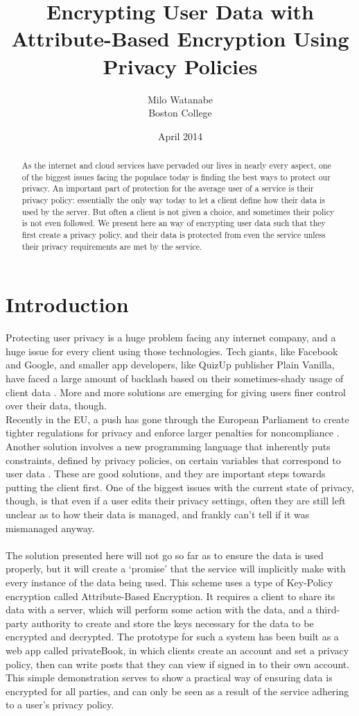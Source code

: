 \documentclass[12pt]{article}
\title {Encrypting User Data with Attribute-Based Encryption Using Privacy Policies}
\author {Milo Watanabe \\ Boston College}
\date{April 2014}
\begin{document}
\maketitle

\begin{abstract}
As the internet and cloud services have pervaded our lives in nearly every aspect, one of the biggest issues facing the populace today is finding the best ways to protect our privacy. An important part of protection for the average user of a service is their privacy policy: essentially the only way today to let a client define how their data is used by the server. But often a client is not given a choice, and sometimes their policy is not even followed.
We present here an way of encrypting user data such that they first create a privacy policy, and their data is protected from even the service unless their privacy requirements are met by the service.
\end{abstract}

\section{Introduction}
Protecting user privacy is a huge problem facing any internet company, and a huge issue for every client using those technologies. Tech giants, like Facebook and Google, and smaller app developers, like QuizUp publisher Plain Vanilla, have faced a large amount of backlash based on their sometimes-shady usage of client data \cite{lawler}. More and more solutions are emerging for giving users finer control over their data, though. \\
Recently in the EU, a push has gone through the European Parliament to create tighter regulations for privacy and enforce larger penalties for noncompliance \cite{bajaj}. Another solution involves a new programming language that inherently puts constraints, defined by privacy policies, on certain variables that correspond to user data \cite{yang}. These are good solutions, and they are important steps towards putting the client first. One of the biggest issues with the current state of privacy, though, is that even if a user edits their privacy settings, often they are still left unclear as to how their data is managed, and frankly can't tell if it was mismanaged anyway. \\\\
The solution presented here will not go so far as to ensure the data is used properly, but it will create a `promise' that the service will implicitly make with every instance of the data being used. This scheme uses a type of Key-Policy encryption called Attribute-Based Encryption. It requires a client to share its data with a server, which will perform some action with the data, and a third-party authority to create and store the keys necessary for the data to be encrypted and decrypted. The prototype for such a system has been built as a web app called privateBook, in which clients create an account and set a privacy policy, then can write posts that they can view if signed in to their own account. This simple demonstration serves to show a practical way of ensuring data is encrypted for all parties, and can only be seen as a result of the service adhering to a user's privacy policy.
\end{document}
